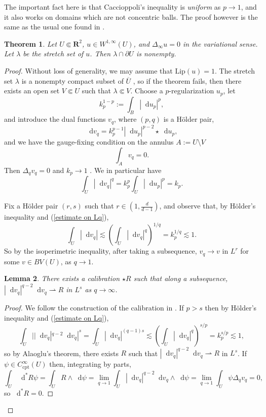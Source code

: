 \documentclass[reqno,11pt]{amsart}
\newcommand{\RR}{\mathbf{R}}
\newcommand*\dif{\mathop{}\!\mathrm{d}}
\newcommand{\Lip}{\mathrm{Lip}}
\newcommand{\cpt}{\mathrm{cpt}}
\newtheorem{theorem}{Theorem}[section]
\newtheorem{lemma}[theorem]{Lemma}
\theoremstyle{definition}
\numberwithin{equation}{section}
\begin{document}
The important fact here is that Caccioppoli's inequality is \emph{uniform} as $p \to 1$, and it also works on domains which are not concentric balls.
The proof however is the same as the usual one found in \cite[Chapter 11]{kinnunen2021maximal}.

\begin{theorem}
Let $U \Subset \RR^2$, $u \in W^{1, \infty}(U)$, and $\Delta_\infty u = 0$ in the variational sense.
Let $\lambda$ be the stretch set of $u$.
Then $\lambda \cap \partial U$ is nonempty.
\end{theorem}
\begin{proof}
Without loss of generality, we may assume that $\Lip(u) = 1$.
The stretch set $\lambda$ is a nonempty compact subset of $\overline U$ \cite[Lemma 4.2]{Crandall2008}, so if the theorem fails, then there exists an open set $V \Subset U$ such that $\lambda \Subset V$.
Choose a $p$-regularization $u_p$, let
$$k_p^{1 - p} := \int_B |\dif u_p|^p,$$
and introduce the dual functions $v_q$, where $(p, q)$ is a H\"older pair,
$$\dif v_q = k_p^{p - 1} |\dif u_p|^{p - 2} \star \dif u_p,$$
and we have the gauge-fixing condition on the annulus $A := U \setminus V$
\begin{equation}\label{annulus average is 0}
\int_A v_q = 0.
\end{equation}
Then $\Delta_q v_q = 0$ and $k_p \to 1$ \cite[\S3]{daskalopoulos2022transverse}.
We in particular have 
\begin{equation}\label{estimate on Lq}
\int_U |\dif v_q|^q = k_p^p \int_U |\dif u_p|^p = k_p.
\end{equation}

Fix a H\"older pair $(r, s)$ such that $r \in (1, \frac{d}{d - 1})$, and observe that, by H\"older's inequality and (\ref{estimate on Lq}),
$$\int_U |\dif v_q| \lesssim \left(\int_U |\dif v_q|^q\right)^{1/q} = k_p^{1/q} \lesssim 1.$$
So by the isoperimetric inequality, after taking a subsequence, $v_q \to v$ in $L^r$ for some $v \in BV(U)$, as $q \to 1$.

\begin{lemma}
There exists a calibration $\star R$ such that along a subsequence, $|\dif v_q|^{q - 2} \dif v_q \rightharpoonup R$ in $L^s$ as $q \to \infty$.
\end{lemma}
\begin{proof}
We follow the construction of the calibration in \cite[Proposition 5.9]{Andreu-Vaillo2004}.
If $p > s$ then by H\"older's inequality and (\ref{estimate on Lq}),
$$\int_U ||\dif v_q|^{q - 2} \dif v_q|^s = \int_U |\dif v_q|^{(q - 1)s} \lesssim \left(\int_U |\dif v_q|^q\right)^{s/p} = k_p^{s/p} \lesssim 1,$$
so by Alaoglu's theorem, there exists $R$ such that $|\dif v_q|^{q - 2} \dif v_q \rightharpoonup R$ in $L^s$.
If $\psi \in C^\infty_\cpt(U)$ then, integrating by parts,
$$\int_U \dif^* R \psi = \int_U R \wedge \dif \psi = \lim_{q \to 1} \int_U |\dif v_q|^{q - 2} \dif v_q \wedge \dif \psi = \lim_{q \to 1} \int_U \psi \Delta_q v_q = 0,$$
so $\dif^* R = 0$.


\end{proof}
\end{proof}
\end{document}

